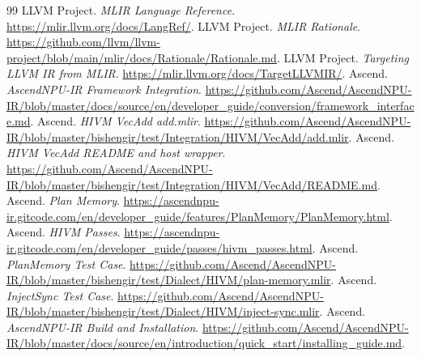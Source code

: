 \documentclass[UTF8,a4paper,11pt]{ctexart}
\begin{document}
\begin{thebibliography}{99}
\footnotesize
\setlength{\itemsep}{0pt}
\setlength{\parsep}{0pt}
\setlength{\topsep}{0.2em}
 LLVM Project. \emph{MLIR Language Reference}. \url{https://mlir.llvm.org/docs/LangRef/}.
 LLVM Project. \emph{MLIR Rationale}. \url{https://github.com/llvm/llvm-project/blob/main/mlir/docs/Rationale/Rationale.md}.
 LLVM Project. \emph{Targeting LLVM IR from MLIR}. \url{https://mlir.llvm.org/docs/TargetLLVMIR/}.
 Ascend. \emph{AscendNPU-IR Framework Integration}. \url{https://github.com/Ascend/AscendNPU-IR/blob/master/docs/source/en/developer_guide/conversion/framework_interface.md}.
 Ascend. \emph{HIVM VecAdd add.mlir}. \url{https://github.com/Ascend/AscendNPU-IR/blob/master/bishengir/test/Integration/HIVM/VecAdd/add.mlir}.
 Ascend. \emph{HIVM VecAdd README and host wrapper}. \url{https://github.com/Ascend/AscendNPU-IR/blob/master/bishengir/test/Integration/HIVM/VecAdd/README.md}.
 Ascend. \emph{Plan Memory}. \url{https://ascendnpu-ir.gitcode.com/en/developer_guide/features/PlanMemory/PlanMemory.html}.
 Ascend. \emph{HIVM Passes}. \url{https://ascendnpu-ir.gitcode.com/en/developer_guide/passes/hivm_passes.html}.
 Ascend. \emph{PlanMemory Test Case}. \url{https://github.com/Ascend/AscendNPU-IR/blob/master/bishengir/test/Dialect/HIVM/plan-memory.mlir}.
 Ascend. \emph{InjectSync Test Case}. \url{https://github.com/Ascend/AscendNPU-IR/blob/master/bishengir/test/Dialect/HIVM/inject-sync.mlir}.
 Ascend. \emph{AscendNPU-IR Build and Installation}. \url{https://github.com/Ascend/AscendNPU-IR/blob/master/docs/source/en/introduction/quick_start/installing_guide.md}.

\end{thebibliography}
\end{document}
